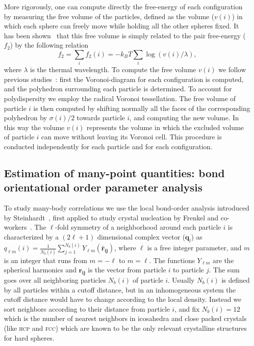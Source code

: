 \documentclass[twocolumn,superscriptaddress]{revtex4}
\begin{document}
More rigorously, one can compute directly the free-energy of each configuration by
measuring the free volume of the particles, defined as the volume ($v(i)$) in which each sphere can freely
move while holding all the other spheres fixed. It has been shown~\cite{Aste2004} that this free
volume is simply related to the pair free-energy ($f_2$) by the following relation
\begin{equation}
f_2=\sum_i f_2(i)=-k_BT\sum_i \log(v(i)/\lambda),
\end{equation}
where $\lambda$ is the thermal wavelength. To compute the free volume $v(i)$ we follow previous
studies~\cite{Aste2004}: first the Voronoi-diagram for each configuration is computed, and the polyhedron
surrounding each particle is determined. To account for polydispersity we employ the radical Voronoi tessellation.
The free volume of particle $i$ is then
computed by shifting normally all the faces of the corresponding polyhedron by $\sigma(i)/2$
towards particle $i$, and computing the new volume. In this way
the volume $v(i)$ represents the volume in which the excluded volume of particle $i$ can move without leaving its Voronoi cell.
This procedure is conducted independently
for each particle and for each configuration.

\subsection{Estimation of many-point quantities: bond orientational order parameter analysis}
To study many-body correlations we use the local bond-order analysis introduced by
Steinhardt~\cite{steinhardt}, first applied to study crystal nucleation by
Frenkel and co-workers~\cite{auer}. 
The $\ell$-fold symmetry of a neighborhood around each particle $i$ is characterized by a $(2\ell+1)$ dimensional complex vector ($\mathbf{q}_l$) as $q_{\ell m}(i)=\frac{1}{N_b(i)}\sum_{j=1}^{N_b(i)} Y_{\ell m}(\mathbf{\hat{r}_{ij}})$, where
$\ell$ is a free integer parameter, and $m$ is an integer
that runs from $m=-\ell$ to $m=\ell$. The functions $Y_{\ell m}$ are the spherical harmonics
and $\mathbf{\hat{r}_{ij}}$ is the vector from particle $i$ to particle $j$.
The sum goes over all neighboring particles $N_b(i)$ of particle $i$. Usually 
$N_b(i)$ is defined by all particles within a cutoff distance, but in an inhomogeneous system
the cutoff distance would have to change according to the local density. Instead we
sort neighbors according to their distance from particle $i$, and
fix $N_b(i)=12$ which is the number of nearest neighbors in icosahedra and close packed crystals (like \textsc{hcp} and \textsc{fcc})
which are known to be the only relevant crystalline structures for hard spheres.
\end{document}
